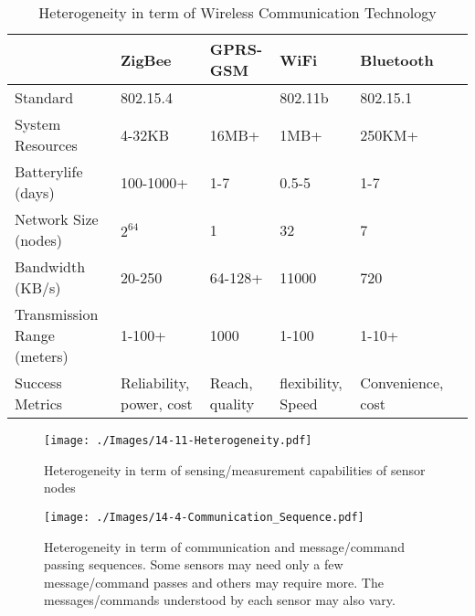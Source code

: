 \documentclass[graybox]{svmult}
\begin{document}
\begin{table}[t]
\footnotesize
\centering
\caption{Heterogeneity in term of Wireless Communication Technology}
\begin{tabular}{l p{2cm} p{1.8cm} p{1.8cm} p{1.8cm} p{1.8cm}}
\hline 
 & \textbf{ZigBee} & \textbf{GPRS-GSM} & \textbf{WiFi} & \textbf{Bluetooth} \\ \hline \hline 
Standard & 802.15.4 &  & 802.11b & 802.15.1 \\ 
System Resources & 4-32KB & 16MB+ & 1MB+ & 250KM+ \\ 
Batterylife (days) & 100-1000+ & 1-7 & 0.5-5 & 1-7 \\ 
Network Size (nodes) & $2^{64}$ & 1 & 32 & 7 \\ 
Bandwidth (KB/s) & 20-250 & 64-128+ & 11000 & 720 \\ 
Transmission \newline Range (meters) & 1-100+ & 1000 & 1-100 & 1-10+ \\ 
Success Metrics & Reliability, power, cost & Reach, quality &  flexibility, Speed & Convenience, cost \\ \hline
\end{tabular}
\label{Table:Wireless Technology Comparison}
\vspace{-6pt}
\end{table}




\begin{figure}[h]
 \centering
\texttt{[image: ./Images/14-11-Heterogeneity.pdf]}
\caption{Heterogeneity in term of sensing/measurement capabilities of sensor nodes}
 \label{Figure:Heterogeneity}
\end{figure}








\begin{figure}[h]
 \centering
\texttt{[image: ./Images/14-4-Communication\_Sequence.pdf]}
\caption{Heterogeneity in term of communication and message/command passing sequences. Some sensors may need only a few  message/command passes and others may require more. The messages/commands understood by each sensor may also vary.}
 \label{Figure:Communication_Sequence}
\end{figure}
\end{document}
